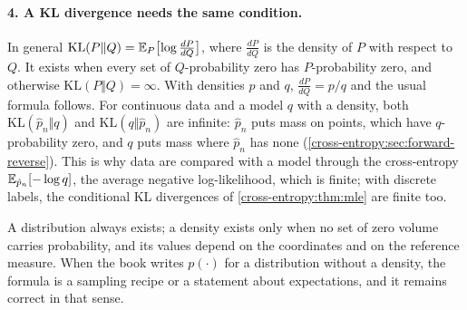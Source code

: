 \begin{notechapter}
\paragraph{4. A KL divergence needs the same condition.} In general
$\mathrm{KL}(P\Vert Q) = \mathbb{E}_P\bigl[\log\frac{dP}{dQ}\bigr]$, where $\frac{dP}{dQ}$ is the density of $P$ with respect to
$Q$. It exists when every set of $Q$-probability zero has $P$-probability zero, and otherwise
$\mathrm{KL}(P\Vert Q) = \infty$. With densities $p$ and $q$, $\frac{dP}{dQ} = p/q$ and the usual formula follows. For
continuous data and a model $q$ with a density, both $\mathrm{KL}(\hat p_n\Vert q)$ and $\mathrm{KL}(q\Vert\hat p_n)$
are infinite: $\hat p_n$ puts mass on points, which have $q$-probability zero, and $q$ puts mass where
$\hat p_n$ has none (\cref{cross-entropy:sec:forward-reverse}). This is why data are compared with a model
through the cross-entropy $\mathbb{E}_{\hat p_n}[-\log q]$, the average negative log-likelihood, which is finite; with
discrete labels, the conditional KL divergences of \cref{cross-entropy:thm:mle} are finite too.

\begin{keyidea}
A distribution always exists; a density exists only when no set of zero volume carries probability, and
its values depend on the coordinates and on the reference measure. When the book writes $p(\cdot)$ for a
distribution without a density, the formula is a sampling recipe or a statement about expectations,
and it remains correct in that sense.
\end{keyidea}


\end{notechapter}
